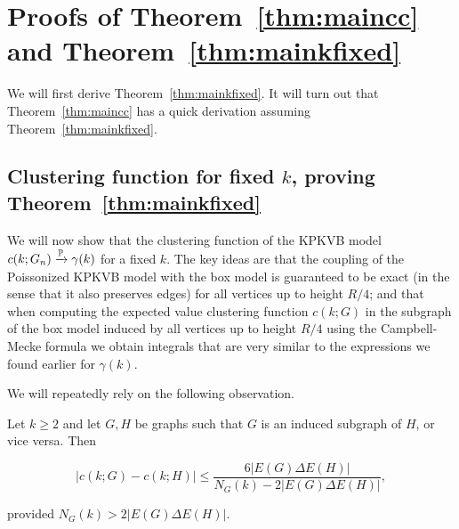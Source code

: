 


\section{Proofs of Theorem~\ref{thm:maincc} and Theorem~\ref{thm:mainkfixed}\label{sec:proofs_fixed_k}}


We will first derive Theorem~\ref{thm:mainkfixed}. It will turn out that Theorem~\ref{thm:maincc} has a quick derivation
assuming Theorem~\ref{thm:mainkfixed}.

\subsection{Clustering function for fixed $k$, proving Theorem~\ref{thm:mainkfixed}}

We will now show that the clustering function of the KPKVB model $c(k;G_n) \xrightarrow{\mathbb{P}} \gamma(k)$ for a fixed $k$. 
The key ideas are that the coupling of the Poissonized KPKVB model with the box model is guaranteed to be exact 
(in the sense that it also preserves edges) for all vertices up to height $R/4$; and that when computing 
the expected value clustering function $c(k;G)$ in the subgraph of the box model induced by all vertices up to height $R/4$
using the Campbell-Mecke formula we obtain integrals that are very similar to the expressions we found earlier for $\gamma(k)$.



We will repeatedly rely on the following observation.

\begin{lemma}\label{lem:ckGckH}
Let $k\geq 2$ and let $G, H$ be graphs such that $G$ is an induced subgraph of $H$, or vice versa.
Then

$$ \left| c(k;G) - c(k;H) \right| \leq \frac{6|E(G)\Delta E(H)|}{N_G(k) - 2|E(G)\Delta E(H)|}, $$

\noindent
provided $N_G(k) > 2|E(G)\Delta E(H)|$.
\end{lemma}


